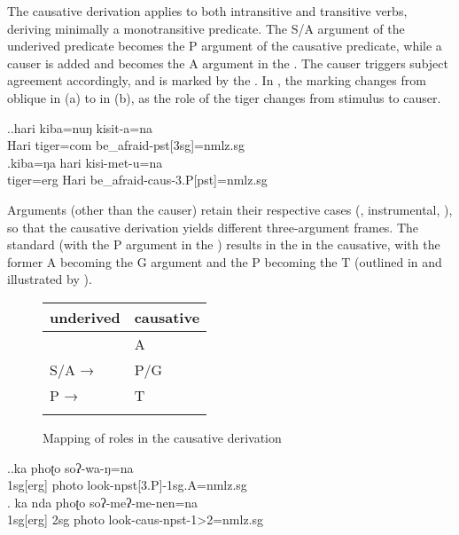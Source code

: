 The causative derivation applies to both intransitive and transitive verbs, deriving minimally a monotransitive predicate. The S/A argument of the underived predicate becomes the P argument of the causative predicate, while a causer is added and becomes the A argument in the . The causer triggers  subject agreement accordingly, and is marked by the  . In \Next, the  marking changes from oblique in (a) to  in (b), as the role of the tiger changes from stimulus to causer.

\ex.\ag.hari kiba=nuŋ kisit-a=na\\
Hari tiger{\sc =com} be\_afraid{\sc -pst[3sg]=nmlz.sg}\\
\bg.kiba=ŋa hari kisi-met-u=na\\
tiger{\sc =erg} Hari be\_afraid{\sc -caus-3.P[pst]=nmlz.sg}\\


Arguments (other than the causer) retain their respective cases (, instrumental, ), so that the causative derivation yields different three-argument frames. The standard  (with the P argument in the ) results in the  in the causative, with the former A becoming the G argument and the P becoming the T (outlined in  and illustrated by \Next). 

\begin{figure}[htp]
\begin{center}
{\small
\begin{tabular}{ll}
\lsptoprule
{\sc underived}&{\sc causative} \\
\midrule
& A\\
S/A →&P/G \\
P →& T\\

\lspbottomrule
\end{tabular}
}
\end{center}
\caption{Mapping of roles in the causative derivation}\label{fig-caus}
\end{figure}
 
 

 
\ex.\ag.ka phoʈo soʔ-wa-ŋ=na\\
{\sc 1sg[erg]} photo look{\sc -npst[3.P]-1sg.A=nmlz.sg}\\
\bg. ka nda phoʈo soʔ-meʔ-me-nen=na\\
{\sc 1sg[erg]} {\sc 2sg} photo look{\sc -caus-npst-1>2=nmlz.sg}\\
 
